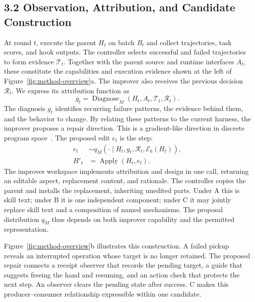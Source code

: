 \subsection*{3.2 Observation, Attribution, and Candidate Construction}
At round $t$, execute the parent $H_t$ on batch $B_t$ and collect trajectories, task scores, and hook outputs. The controller selects successful and failed trajectories to form evidence $\mathcal T_t$. Together with the parent source and runtime interfaces $A_t$, these constitute the capabilities and execution evidence shown at the left of Figure~\ref{fig:method-overview}a. The improver also receives the previous decision $\mathcal R_t$. We express its attribution function as
\begin{equation}
g_t=\operatorname{Diagnose}_M(H_t,A_t,\mathcal T_t,\mathcal R_t).
\label{eq:direction}
\end{equation}
The diagnosis $g_t$ identifies recurring failure patterns, the evidence behind them, and the behavior to change. By relating these patterns to the current harness, the improver proposes a repair direction. This is a gradient-like direction in discrete program space~\citep{protegi,textgrad}. The proposed edit $e_t$ is the step:
\begin{align}
e_t &\sim q_M(\cdot\mid H_t,g_t,\mathcal R_t,\mathcal E_k(H_t)),\nonumber\\
H'_t&=\operatorname{Apply}(H_t,e_t).
\label{eq:proposal}
\end{align}
The improver workspace implements attribution and design in one call, returning an editable aspect, replacement content, and rationale. The controller copies the parent and installs the replacement, inheriting unedited parts. Under A this is skill text; under B it is one independent component; under C it may jointly replace skill text and a composition of named mechanisms. The proposal distribution $q_M$ thus depends on both improver capability and the permitted representation.

Figure~\ref{fig:method-overview}b illustrates this construction. A failed pickup reveals an interrupted operation whose target is no longer retained. The proposed repair connects a receipt observer that records the pending target, a guide that suggests freeing the hand and resuming, and an action check that protects the next step. An observer clears the pending state after success. C makes this producer--consumer relationship expressible within one candidate.

